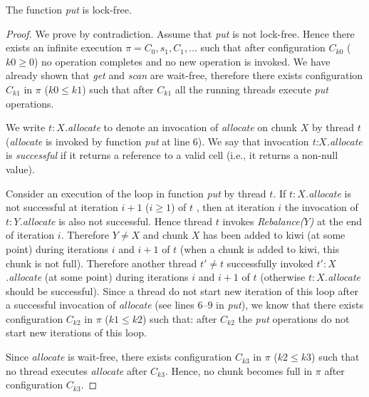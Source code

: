 \begin{lemma}
\label{proof:aaaaaaaa}
The function \emph{put} is lock-free.
\end{lemma}
\begin{proof}
We prove by contradiction.
Assume that \emph{put} is not lock-free.
Hence there exists an infinite execution $\pi = C_0,s_1,C_1,\ldots$ such that
after configuration $C_{k0}$ ($k0 \geq 0$) no operation completes and no new operation is invoked.
%
We have already shown that \emph{get} and \emph{scan} are wait-free,
 therefore there exists configuration $C_{k1}$ in $\pi$ ($k0 \leq k1$) such that after $C_{k1}$ all the running threads execute  \emph{put} operations.


We write \emph{$t:X$.allocate} to denote an invocation of \emph{allocate} on chunk $X$ by thread $t$
(\emph{allocate} is invoked by function \emph{put} at line $6$).
We say that invocation \emph{t:$X$.allocate} is \emph{successful}
if it returns a reference to a valid cell (i.e., it returns a non-null value).

Consider an execution of the loop in function \emph{put} by thread $t$.
If \emph{$t:X$.allocate} is not successful at iteration $i+1$ ($i \geq 1$) of $t$ ,
then at iteration $i$ the invocation of \emph{$t:Y$.allocate} is also not successful.
Hence thread $t$ invokes \emph{Rebalance($Y$)} at the end of iteration $i$.
Therefore $Y \neq X$ and chunk $X$ has been added to kiwi (at some point) during iterations $i$ and $i+1$ of $t$
(when a chunk is added to kiwi, this chunk is not full).
Therefore another thread $t' \neq t$ successfully invoked \emph{$t':X$.allocate} (at some point) during iterations $i$ and $i+1$ of $t$
(otherwise \emph{$t:X$.allocate} should be successful).
%
Since a thread do not start new iteration of this loop after a successful invocation of \emph{allocate} (see lines $6$--$9$ in \emph{put}),
 we know that there exists configuration $C_{k2}$ in $\pi$ ($k1 \leq k2$) such that:
after $C_{k2}$ the \emph{put} operations do not start new iterations of this loop.

Since \emph{allocate} is wait-free, there exists configuration $C_{k3}$ in $\pi$ ($k2 \leq k3$) such that
no thread executes \emph{allocate} after $C_{k3}$.
Hence, no chunk becomes full in $\pi$ after configuration $C_{k3}$.




\end{proof}
